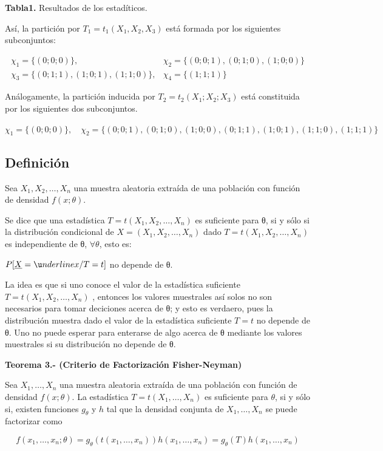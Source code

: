 \documentclass[
  11pt,
]{report}
\begin{document}
\textbf{Tabla1.} Resultados de los estadíticos.

Así, la partición por \(T_1=t_1(X_1,X_2,X_3)\) está formada por los
siguientes subconjuntos:

\[\begin{matrix}
\chi_1 = \{(0;0;0)\}, & \chi_2 = \{(0;0;1), (0;1;0), (1;0;0)\} \\
\chi_3 = \{(0;1;1), (1;0;1), (1;1;0)\}, & \chi_4 = \{(1;1;1)\}
\end{matrix}\]

Análogamente, la partición inducida por \(T_2 = t_2(X_1; X_2; X_3)\)
está constituida por los siguientes dos subconjuntos.

\(\chi_1 = \{(0;0;0)\}, \quad \chi_2 = \{(0;0;1), (0;1;0), (1;0;0), (0;1;1), (1;0;1), (1;1;0), (1;1;1)\}\)

\subsection{Definición}\label{definiciuxf3n-2}

Sea \(X_1, X_2, \dots, X_n\) una muestra aleatoria extraída de una
población con función de densidad \(f(x;\theta)\).

Se dice que una estadística \(T = t(X_1, X_2, \ldots, X_n)\) es
suficiente para θ, si y sólo si la distribución condicional de
\(X = (X_1, X_2, \ldots, X_n)\) dado \(T = t(X_1, X_2, \ldots, X_n)\) es
independiente de θ, \(\forall \theta\), esto es:

\(P[\underline{X} = \u nderline{x} / T = t]\) no depende de θ.

La idea es que si uno conoce el valor de la estadística suficiente
\(T = t(X_1, X_2, \ldots, X_n)\) , entonces los valores muestrales así
solos no son necesarios para tomar deciciones acerca de θ; y esto es
verdaero, pues la distribución muestra dado el valor de la estadística
suficiente \(T=t\) no depende de θ. Uno no puede esperar para enterarse
de algo acerca de θ mediante los valores muestrales si su distribución
no depende de θ.

\textbf{Teorema 3.- (Criterio de Factorización Fisher-Neyman)}

Sea \(X_1, \dots, X_n\) una muestra aleatoria extraída de una población
con función de densidad \(f(x; \theta)\). La estadística
\(T = t(X_1, \dots, X_n)\) es suficiente para \(\theta\), si y sólo si,
existen funciones \(g_\theta\) y \(h\) tal que la densidad conjunta de
\(X_1, \dots, X_n\) se puede factorizar como

\[f(x_1, \dots, x_n; \theta) = g_\theta(t(x_1, \dots, x_n)) h(x_1, \dots, x_n) = g_\theta(T) h(x_1, \dots, x_n)\]
\end{document}
